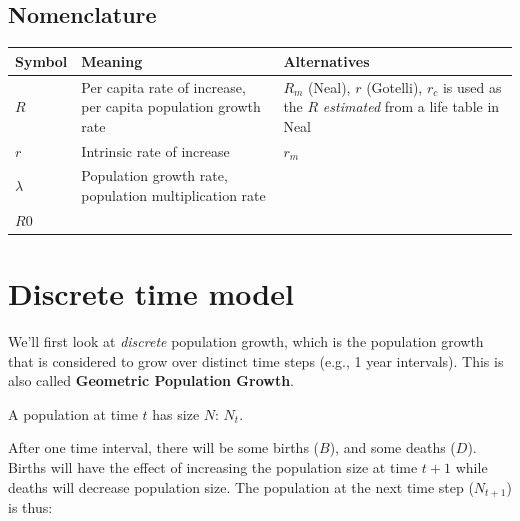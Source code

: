 \documentclass[
  a4paper]{book}
\begin{document}
\subsection{Nomenclature}\label{nomenclature}

\begin{longtable}[]{@{}
  >{\raggedright\arraybackslash}p{}
  >{\raggedright\arraybackslash}p{}
  >{\raggedright\arraybackslash}p{}@{}}
\toprule\noalign{}
\begin{minipage}[b]{\linewidth}\raggedright
Symbol
\end{minipage} & \begin{minipage}[b]{\linewidth}\raggedright
Meaning
\end{minipage} & \begin{minipage}[b]{\linewidth}\raggedright
Alternatives
\end{minipage} \\
\midrule\noalign{}
\endhead
\bottomrule\noalign{}
\endlastfoot
\(R\) & Per capita rate of increase, per capita population growth rate & \(R_m\) (Neal), \(r\) (Gotelli), \(r_c\) is used as the \(R\) \emph{estimated} from a life table in Neal \\
\(r\) & Intrinsic rate of increase & \(r_m\) \\
\(\lambda\) & Population growth rate, population multiplication rate & \\
\(R0\) & & \\
\end{longtable}

\section{Discrete time model}\label{discrete-time-model}

We'll first look at \emph{discrete} population growth, which is the population growth that is considered to grow over distinct time steps (e.g., 1 year intervals). This is also called \textbf{Geometric Population Growth}.

A population at time \(t\) has size \(N\): \(N_t\).

After one time interval, there will be some births (\(B\)), and some deaths (\(D\)). Births will have the effect of increasing the population size at time \(t+1\) while deaths will decrease population size. The population at the next time step (\(N_{t+1}\)) is thus:
\end{document}
